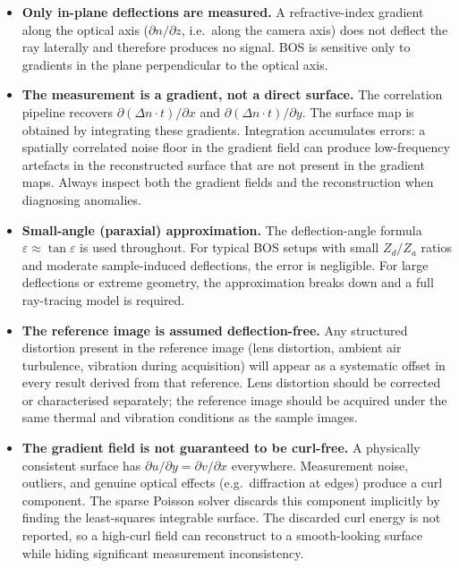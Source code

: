 \documentclass[11pt]{article}
\begin{document}
\begin{itemize}
  \item \textbf{Only in-plane deflections are measured.}
        A refractive-index gradient along the optical axis ($\partial n /
        \partial z$, i.e.\ along the camera axis) does not deflect the ray
        laterally and therefore produces no signal. BOS is sensitive only
        to gradients in the plane perpendicular to the optical axis.

  \item \textbf{The measurement is a gradient, not a direct surface.}
        The correlation pipeline recovers $\partial(\Delta n \cdot t) /
        \partial x$ and $\partial(\Delta n \cdot t) / \partial y$. The
        surface map is obtained by integrating these gradients. Integration
        accumulates errors: a spatially correlated noise floor in the
        gradient field can produce low-frequency artefacts in the
        reconstructed surface that are not present in the gradient maps.
        Always inspect both the gradient fields and the reconstruction
        when diagnosing anomalies.

  \item \textbf{Small-angle (paraxial) approximation.}
        The deflection-angle formula $\varepsilon \approx \tan\varepsilon$
        is used throughout. For typical BOS setups with small $Z_d / Z_a$
        ratios and moderate sample-induced deflections, the error is
        negligible. For large deflections or extreme geometry, the
        approximation breaks down and a full ray-tracing model is required.

  \item \textbf{The reference image is assumed deflection-free.}
        Any structured distortion present in the reference image
        (lens distortion, ambient air turbulence, vibration during
        acquisition) will appear as a systematic offset in every result
        derived from that reference. Lens distortion should be corrected
        or characterised separately; the reference image should be acquired
        under the same thermal and vibration conditions as the sample
        images.

  \item \textbf{The gradient field is not guaranteed to be curl-free.}
        A physically consistent surface has $\partial u / \partial y =
        \partial v / \partial x$ everywhere. Measurement noise, outliers,
        and genuine optical effects (e.g.\ diffraction at edges) produce a
        curl component. The sparse Poisson solver discards this component
        implicitly by finding the least-squares integrable surface. The
        discarded curl energy is not reported, so a high-curl field can
        reconstruct to a smooth-looking surface while hiding significant
        measurement inconsistency.

\end{itemize}
\end{document}
